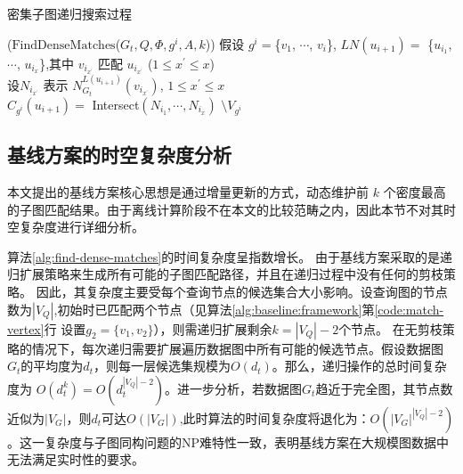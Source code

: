 \begin{algorithm}[h!]
	\small
	\caption{密集子图递归搜索过程}
	\label{alg:find-dense-matches}
	\iFunc($\mathrm{FindDenseMatches}${(}$G_t, Q, \Phi, g^i, A, k${)})
	{
		假设 $g^{i}=$\{$v_{1}$, $\cdots$, $v_{i}$\}, $LN(u_{i+1})=$ \{$u_{i_1}$, $\cdots$, $u_{i_x}$\},其中 $v_{i_{x^\prime}}$ 匹配 $u_{i_{x^\prime}}$ ($1\leq x^\prime\leq x$)  \label{code:base-extension:begin} \\
		设$N_{i_{x^\prime}}$ 表示 $N_{G_t}^{L(u_{i+1})}(v_{i_{x^\prime}})$, $1\leq x^\prime\leq x$  \label{code:base-intersect:start} \\
		$C_{g^i}(u_{i+1})= $ Intersect$(N_{i_1}, \cdots, N_{i_x})$ $\setminus V_{g^i}$  \label{code:intersect}  \label{code:base-intersect:end}\\
		\Return 
	}
\end{algorithm}	
\subsection{基线方案的时空复杂度分析}
本文提出的基线方案核心思想是通过增量更新的方式，动态维护前 $k$ 个密度最高的子图匹配结果。由于离线计算阶段不在本文的比较范畴之内，因此本节不对其时空复杂度进行详细分析。

算法\ref{alg:find-dense-matches}的时间复杂度呈指数增长。
由于基线方案采取的是递归扩展策略来生成所有可能的子图匹配路径，并且在递归过程中没有任何的剪枝策略。
因此，其复杂度主要受每个查询节点的候选集合大小影响。设查询图的节点数为$|V_Q|$,初始时已匹配两个节点（见算法\ref{alg:baseline:framework}第\ref{code:match-vertex}行 设置$g_2=\{v_1,v_2\}$），则需递归扩展剩余$k=|V_Q|-2$个节点。
在无剪枝策略的情况下，每次递归需要扩展遍历数据图中所有可能的候选节点。假设数据图$G_t$的平均度为$d_t$，则每一层候选集规模为$O(d_t)$。那么，递归操作的总时间复杂度为
$O(d_{t}^{k})=O(d_{t}^{|V_Q|-2})$。进一步分析，若数据图$G_t$趋近于完全图，其节点数近似为$|V_G|$，则$d_t$可达$O(|V_G|)$,此时算法的时间复杂度将退化为：$O(|V_G|^{|V_Q|-2})$。这一复杂度与子图同构问题的NP难特性一致，表明基线方案在大规模图数据中无法满足实时性的要求。

